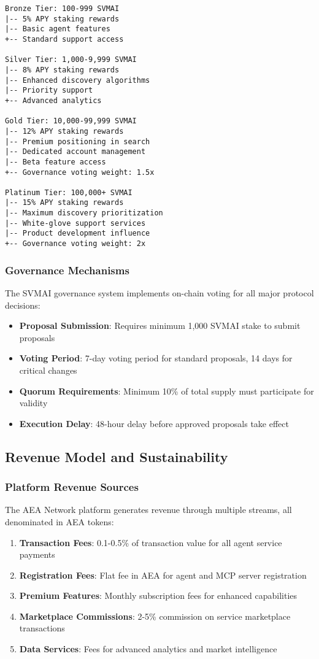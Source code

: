 \documentclass[12pt,a4paper]{article}
\begin{document}
\begin{verbatim}
Bronze Tier: 100-999 SVMAI
|-- 5% APY staking rewards
|-- Basic agent features
+-- Standard support access

Silver Tier: 1,000-9,999 SVMAI
|-- 8% APY staking rewards
|-- Enhanced discovery algorithms
|-- Priority support
+-- Advanced analytics

Gold Tier: 10,000-99,999 SVMAI
|-- 12% APY staking rewards
|-- Premium positioning in search
|-- Dedicated account management
|-- Beta feature access
+-- Governance voting weight: 1.5x

Platinum Tier: 100,000+ SVMAI
|-- 15% APY staking rewards
|-- Maximum discovery prioritization
|-- White-glove support services
|-- Product development influence
+-- Governance voting weight: 2x
\end{verbatim}

\subsubsection{Governance Mechanisms}

The SVMAI governance system implements on-chain voting for all major protocol decisions:

\begin{itemize}
\item \textbf{Proposal Submission}: Requires minimum 1,000 SVMAI stake to submit proposals
\item \textbf{Voting Period}: 7-day voting period for standard proposals, 14 days for critical changes
\item \textbf{Quorum Requirements}: Minimum 10\% of total supply must participate for validity
\item \textbf{Execution Delay}: 48-hour delay before approved proposals take effect
\end{itemize}

\subsection{Revenue Model and Sustainability}

\subsubsection{Platform Revenue Sources}

The AEA Network platform generates revenue through multiple streams, all denominated in AEA tokens:

\begin{enumerate}
\item \textbf{Transaction Fees}: 0.1-0.5\% of transaction value for all agent service payments
\item \textbf{Registration Fees}: Flat fee in AEA for agent and MCP server registration
\item \textbf{Premium Features}: Monthly subscription fees for enhanced capabilities
\item \textbf{Marketplace Commissions}: 2-5\% commission on service marketplace transactions
\item \textbf{Data Services}: Fees for advanced analytics and market intelligence
\end{enumerate}
\end{document}
